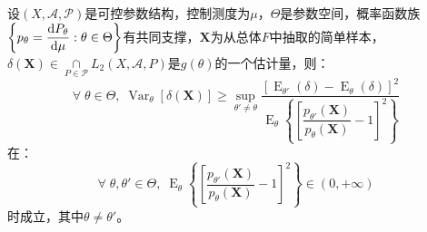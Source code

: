 \begin{theorem}
	\label{theo:Hammersley-Chapman-RobbinsInequality}
	设$(X,\mathscr{A},\mathscr{P})$是可控参数结构，控制测度为$\mu$，$\Theta$是参数空间，概率函数族$\left\{p_{\theta}=\dfrac{\mathop{}\!\mathrm{d} P_{\theta}}{\mathop{}\!\mathrm{d}\mu}:\theta\in\Theta\right\}$有共同支撑，$\mathbf{X}$为从总体$F$中抽取的简单样本，$\delta(\mathbf{X})\in\underset{P\in\mathscr{P}}{\cap}L_2(X,\mathscr{A},P)$是$g(\theta)$的一个估计量，则：
	\begin{equation*}
		\forall\;\theta\in\Theta,\;\operatorname{Var}_{\theta}[\delta(\mathbf{X})]\geqslant\sup_{\theta'\ne\theta}\dfrac{[\operatorname{E}_{\theta'}(\delta)-\operatorname{E}_{\theta}(\delta)]^2}{\operatorname{E}_{\theta}\left\{\left[\dfrac{p_{\theta'}(\mathbf{X})}{p_{\theta}(\mathbf{X})}-1\right]^2\right\}}
	\end{equation*}
	在：
	\begin{equation*}
		\forall\;\theta,\theta'\in\Theta,\;\operatorname{E}_{\theta}\left\{\left[\dfrac{p_{\theta'}(\mathbf{X})}{p_{\theta}(\mathbf{X})}-1\right]^2\right\}\in(0,+\infty)
	\end{equation*}
	时成立，其中$\theta\ne\theta'$。
\end{theorem}
